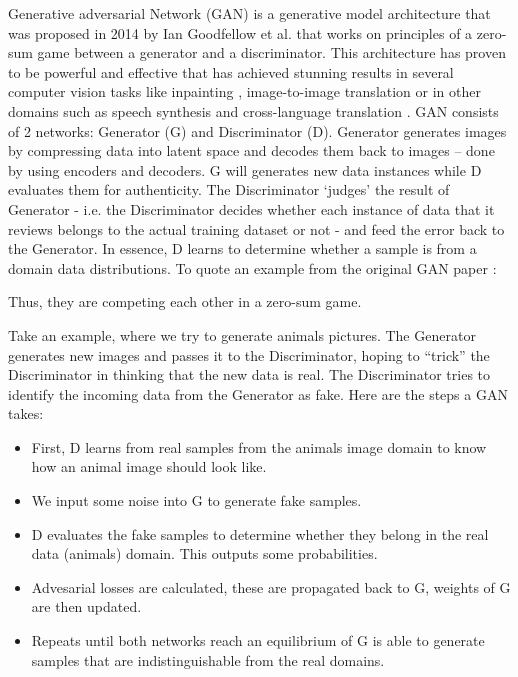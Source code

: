 \documentclass[12pt]{report}
\begin{document}
Generative adversarial Network (GAN) is a generative model architecture that was proposed in 2014 by Ian Goodfellow et al.\cite{gan} that works on principles of a zero-sum game between a generator and a discriminator. This architecture has proven to be powerful and effective that has achieved stunning results in several computer vision tasks like inpainting \cite{image-completion}, image-to-image translation \cite{cycle-gan} or in other domains such as speech synthesis \cite{audio-gan} and cross-language translation \cite{nlp}.
GAN consists of 2 networks: Generator (G) and Discriminator (D). Generator generates images by compressing data into latent space and decodes them back to images – done by using encoders and decoders. G will generates new data instances while D evaluates them for authenticity. The Discriminator ‘judges’ the result of Generator -  i.e. the Discriminator decides whether each instance of data that it reviews belongs to the actual training dataset or not - and feed the error back to the Generator. In essence, D learns to determine whether a sample is from a domain data distributions. To quote an example from the original GAN paper \cite{gan}:


Thus, they are competing each other in a zero-sum game.

Take an example, where we try to generate animals pictures. The Generator generates new images and passes it to the Discriminator, hoping to “trick” the Discriminator in thinking that the new data is real. The Discriminator tries to identify the incoming data from the Generator as fake.
Here are the steps a GAN takes:
\begin{itemize}
	\item First, D learns from real samples from the animals image domain to know how an animal image should look like.
	\item We input some noise into G to generate fake samples.
	\item D evaluates the fake samples to determine whether they belong in the real data (animals) domain. This outputs some probabilities. 
	\item Advesarial losses are calculated, these are propagated back to G, weights of G are then updated.
	\item Repeats until both networks reach an equilibrium of G is able to generate samples that are indistinguishable from the real domains.
\end{itemize}
\end{document}
